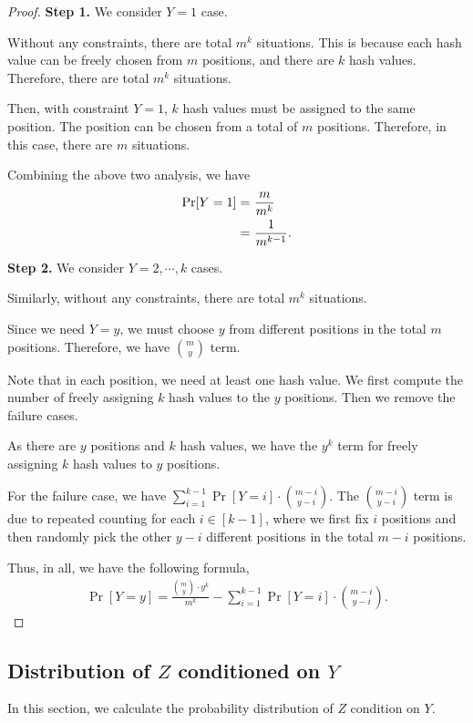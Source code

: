 \begin{proof}

{\bf Step 1.} We consider $Y = 1$ case. 

Without any constraints, there are total $m^k$ situations. This is because each hash value can be freely chosen from $m$ positions, and there are $k$ hash values. Therefore, there are total $m^k$ situations. 

Then, with constraint $Y = 1$, $k$ hash values must be assigned to the same position. The position can be chosen from a total of $m$ positions. Therefore, in this case, there are $m$ situations. 

Combining the above two analysis, we have
\begin{align*}
    \Pr[Y = 1] = & ~ \frac{m}{m^k} \notag \\
    = & ~ \frac{1}{m^{k - 1}}.
\end{align*}

{\bf Step 2.} We consider $Y = 2, \cdots , k$ cases.

Similarly, without any constraints, there are total $m^k$ situations. 

Since we need $Y = y$, we must choose $y$ from different positions in the total $m$ positions. Therefore, we have $\binom{m}{y}$ term.

Note that in each position, we need at least one hash value. We first compute the number of freely assigning $k$ hash values to the $y$ positions. Then we remove the failure cases.  

As there are $y$ positions and $k$ hash values, we have the $y^k$ term for freely assigning $k$ hash values to $y$ positions.

For the failure case, we have $\sum_{i=1}^{k-1} \Pr[Y = i] \cdot \binom{m - i}{y -i}$. The $\binom{m - i}{y -i}$ term is due to repeated counting for each $i \in [k-1]$, where we first fix $i$ positions and then randomly pick the other $y-i$ different positions in the total $m-i$ positions. 

Thus, in all, we have the following formula,
\begin{align*}
    \Pr[Y = y] = \frac{\binom{m}{y} \cdot y ^k}{m^k} - \sum_{i=1}^{k-1} \Pr[Y = i] \cdot \binom{m - i}{y -i}.
\end{align*}

\end{proof}

\subsection{Distribution of \texorpdfstring{$Z$}{} conditioned on \texorpdfstring{$Y$}{}}\label{sec:distribution_Z}
In this section, we calculate the probability distribution of $Z$ condition on $Y$.


